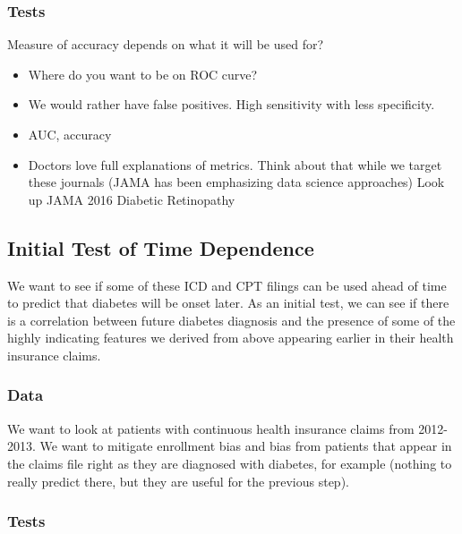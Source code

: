 \documentclass{article}
\begin{document}
\subsubsection{Tests}

Measure of accuracy depends on what it will be used for?

\begin{itemize}
\item Where do you want to be on ROC curve? 
\item We would rather have false positives. High sensitivity with less specificity. 
\item AUC, accuracy 
\item Doctors love full explanations of metrics. Think about that while we target these journals (JAMA has been emphasizing data science approaches) Look up JAMA 2016 Diabetic Retinopathy
\end{itemize}

\subsection{Initial Test of Time Dependence}

We want to see if some of these ICD and CPT filings can be used ahead of time to predict that diabetes will be onset later. As an initial test, we can see if there is a correlation between future diabetes diagnosis and the presence of some of the highly indicating features we derived from above appearing earlier in their health insurance claims.

\subsubsection{Data}

We want to look at patients with continuous health insurance claims from 2012-2013. We want to mitigate enrollment bias and bias from patients that appear in the claims file right as they are diagnosed with diabetes, for example (nothing to really predict there, but they are useful for the previous step). 

\subsubsection{Tests}
\end{document}
